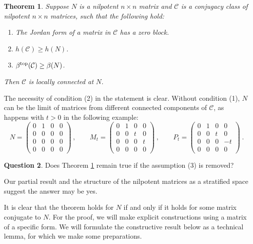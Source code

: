 \documentclass{amsart}
\newtheorem{theorem}{Theorem}[section]
\theoremstyle{definition}
\newtheorem{question}[theorem]{Question}
\theoremstyle{remark}
\numberwithin{equation}{section}
\begin{document}
{{\begin{theorem} \label{matrixconnection}
Suppose $N$ is a nilpotent $n\times n$ matrix and  $\mathcal C$ is a conjugacy class of nilpotent 
$n\times n$ matrices, such that the following hold: 
\begin{enumerate} 
\item The Jordan form of a matrix in $\mathcal C$ has a 
zero block.  
\item  $h(\mathcal C)\geq h(N)$. 
\item 
$\beta^{\textnormal{top}}(\mathcal C)\geq \beta(N)$. 
\end{enumerate} 
Then $\mathcal C$ is locally connected at $N$. 
\end{theorem} 

The necessity of condition (2) in the statement is clear. 
Without condition (1), $N$ can be the limit of matrices from 
different connected components of $\mathcal C$, as happens 
with $t> 0$ in the following example: 
\[
N= 
\begin{pmatrix} 
0 & 1 & 0 & 0 \\ 0 & 0 & 0 & 0 \\ 0 & 0 & 0 & 0 \\ 0 & 0 & 0 & 0 
\end{pmatrix} \ , \qquad 
M_t=
\begin{pmatrix} 
0 & 1 & 0 & 0 \\ 0 & 0 & t & 0 \\ 0 & 0 & 0 & t \\ 0 & 0 & 0 & 0 
\end{pmatrix} \ , \qquad 
P_t=
\begin{pmatrix} 
0 & 1 & 0 & 0 \\ 0 & 0 & t & 0 \\ 0 & 0 &  0& -t \\ 0 & 0 & 0 & 0 
\end{pmatrix} \ .  
\] 


\begin{question} 
Does Theorem \ref{matrixconnection} remain true if the assumption 
(3) is removed? 
\end{question} 

Our partial result and the structure of the nilpotent matrices as 
a stratified space \cite{Ve1,Ve2,Wh} suggest the answer may be yes. 

It is clear that the theorem holds for $N$ if and only if 
it holds for some matrix conjugate to $N$. For the proof, 
we will make explicit constructions using a matrix of a 
specific form. We will formulate the constructive result 
 below as a technical lemma, for which we make some 
preparations.  


}}
\end{document}
